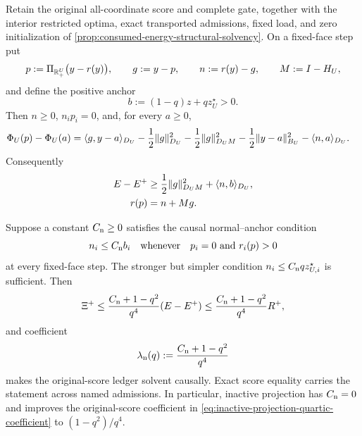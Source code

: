 \begin{proposition}
\label{prop:original-score-normal-anchor}
Retain the original all-coordinate score and complete gate, together with the
interior restricted optima, exact transported admissions, fixed load, and
zero initialization of
\cref{prop:consumed-energy-structural-solvency}.  On a fixed-face step put
\begin{equation}
 p:=\Pi_{\mathbb{R}_+^U}\bigl(y-r(y)\bigr),\qquad
 g:=y-p,\qquad n:=r(y)-g,\qquad M:=I-H_U,
 \label{eq:projection-normal-definition}
\end{equation}
and define the positive anchor
\begin{equation*}
 b:=(1-q)z+qz_U^\star>0.
\end{equation*}
Then $n\geq0$, $n_ip_i=0$, and, for every $a\geq0$,
\begin{align}
 \Phi_U(p)-\Phi_U(a)
 &=\langle g,y-a\rangle_{D_U}
   -\frac12\lVert g\rVert_{D_U}^2
   -\frac12\lVert g\rVert_{D_UM}^2
   -\frac12\lVert y-a\rVert_{B_U}^2
   -\langle n,a\rangle_{D_U}.
 \label{eq:projection-normal-three-point}
\end{align}
Consequently
\begin{align}
 E-E^+
 &\geq\frac12\lVert g\rVert_{D_UM}^2+\langle n,b\rangle_{D_U},
 \label{eq:projection-normal-energy}\\
 r(p)&=n+Mg.
 \label{eq:projection-normal-residual}
\end{align}

Suppose a constant $C_{\rm n}\geq0$ satisfies the causal normal--anchor
condition
\begin{equation}
 n_i\leq C_{\rm n}b_i
 \quad\hbox{whenever}\quad p_i=0\ \hbox{and}\ r_i(p)>0
 \label{eq:projection-normal-anchor}
\end{equation}
at every fixed-face step.  The stronger but simpler condition
$n_i\leq C_{\rm n}qz_{U,i}^\star$ is sufficient.  Then
\begin{equation}
 \Xi^+
 \leq\frac{C_{\rm n}+1-q^2}{q^4}(E-E^+)
 \leq\frac{C_{\rm n}+1-q^2}{q^4}R^+,
 \label{eq:projection-normal-quartic}
\end{equation}
and coefficient
\begin{equation*}
 \lambda_{\rm n}(q):=\frac{C_{\rm n}+1-q^2}{q^4}
\end{equation*}
makes the original-score ledger solvent causally.  Exact score equality
carries the statement across named admissions.  In particular, inactive
projection has $C_{\rm n}=0$ and improves the original-score coefficient in
\cref{eq:inactive-projection-quartic-coefficient} to
$(1-q^2)/q^4$.


\end{proposition}
